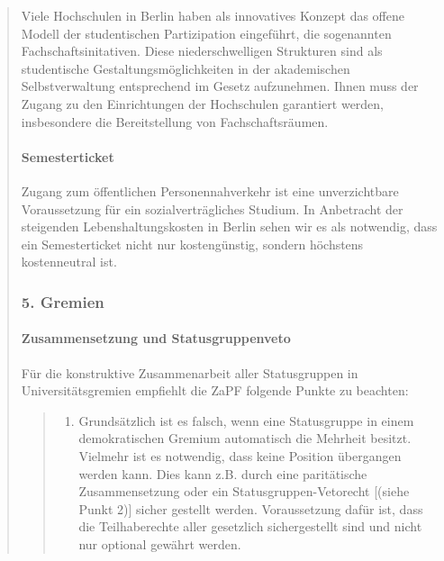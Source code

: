\documentclass[DIV=14]{scrartcl}
\begin{document}
\begin{quote}
Viele Hochschulen in Berlin haben als innovatives Konzept das offene Modell der studentischen Partizipation eingeführt, die sogenannten Fachschaftsinitativen. Diese niederschwelligen Strukturen sind als studentische Gestaltungsmöglichkeiten in der akademischen Selbstverwaltung entsprechend im Gesetz aufzunehmen. Ihnen muss der Zugang zu den Einrichtungen der Hochschulen garantiert werden, insbesondere die Bereitstellung von Fachschaftsräumen.

\hypertarget{semesterticket}{%
\paragraph{Semesterticket}\label{semesterticket}}

Zugang zum öffentlichen Personennahverkehr ist eine unverzichtbare Voraussetzung für ein sozialverträgliches Studium. In Anbetracht der steigenden Lebenshaltungskosten in Berlin sehen wir es als notwendig, dass ein Semesterticket nicht nur kostengünstig, sondern höchstens kostenneutral ist.


\hypertarget{gremien}{%
\subsubsection*{5. Gremien}\label{gremien}}

\hypertarget{zusammensetzung-und-statusgruppenveto}{%
\paragraph{Zusammensetzung und Statusgruppenveto}\label{zusammensetzung-und-statusgruppenveto}}


Für die konstruktive Zusammenarbeit aller Statusgruppen in Universitätsgremien empfiehlt die ZaPF folgende Punkte zu beachten:

\begin{quote}
\begin{enumerate}
\def\labelenumi{\arabic{enumi}.}
\item Grundsätzlich ist es falsch, wenn eine Statusgruppe in einem demokratischen Gremium automatisch die Mehrheit besitzt. Vielmehr ist es notwendig, dass keine Position übergangen werden kann. Dies kann z.B. durch eine paritätische Zusammensetzung oder ein Statusgruppen-Vetorecht {[}(siehe Punkt 2){]} sicher gestellt werden. Voraussetzung dafür ist, dass die Teilhaberechte aller gesetzlich sichergestellt sind und nicht nur optional gewährt werden.
\end{enumerate}
\end{quote}


\end{quote}
\end{document}
